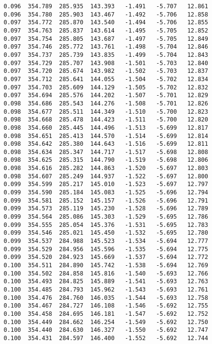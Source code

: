 \begin{verbatim}
   0.096  354.789  285.935  143.393   -1.491   -5.707   12.861
   0.096  354.780  285.903  143.467   -1.492   -5.706   12.858
   0.097  354.772  285.870  143.540   -1.494   -5.706   12.855
   0.097  354.763  285.837  143.614   -1.495   -5.705   12.852
   0.097  354.754  285.805  143.687   -1.497   -5.705   12.849
   0.097  354.746  285.772  143.761   -1.498   -5.704   12.846
   0.097  354.737  285.739  143.835   -1.499   -5.704   12.843
   0.097  354.729  285.707  143.908   -1.501   -5.703   12.840
   0.097  354.720  285.674  143.982   -1.502   -5.703   12.837
   0.097  354.712  285.641  144.055   -1.504   -5.702   12.834
   0.097  354.703  285.609  144.129   -1.505   -5.702   12.832
   0.097  354.694  285.576  144.202   -1.507   -5.701   12.829
   0.098  354.686  285.543  144.276   -1.508   -5.701   12.826
   0.098  354.677  285.511  144.349   -1.510   -5.700   12.823
   0.098  354.668  285.478  144.423   -1.511   -5.700   12.820
   0.098  354.660  285.445  144.496   -1.513   -5.699   12.817
   0.098  354.651  285.413  144.570   -1.514   -5.699   12.814
   0.098  354.642  285.380  144.643   -1.516   -5.699   12.811
   0.098  354.634  285.347  144.717   -1.517   -5.698   12.808
   0.098  354.625  285.315  144.790   -1.519   -5.698   12.806
   0.098  354.616  285.282  144.863   -1.520   -5.697   12.803
   0.098  354.607  285.249  144.937   -1.522   -5.697   12.800
   0.099  354.599  285.217  145.010   -1.523   -5.697   12.797
   0.099  354.590  285.184  145.083   -1.525   -5.696   12.794
   0.099  354.581  285.152  145.157   -1.526   -5.696   12.791
   0.099  354.573  285.119  145.230   -1.528   -5.696   12.789
   0.099  354.564  285.086  145.303   -1.529   -5.695   12.786
   0.099  354.555  285.054  145.376   -1.531   -5.695   12.783
   0.099  354.546  285.021  145.450   -1.532   -5.695   12.780
   0.099  354.537  284.988  145.523   -1.534   -5.694   12.777
   0.099  354.529  284.956  145.596   -1.535   -5.694   12.775
   0.099  354.520  284.923  145.669   -1.537   -5.694   12.772
   0.100  354.511  284.890  145.742   -1.538   -5.694   12.769
   0.100  354.502  284.858  145.816   -1.540   -5.693   12.766
   0.100  354.493  284.825  145.889   -1.541   -5.693   12.763
   0.100  354.485  284.793  145.962   -1.543   -5.693   12.761
   0.100  354.476  284.760  146.035   -1.544   -5.693   12.758
   0.100  354.467  284.727  146.108   -1.546   -5.692   12.755
   0.100  354.458  284.695  146.181   -1.547   -5.692   12.752
   0.100  354.449  284.662  146.254   -1.549   -5.692   12.750
   0.100  354.440  284.630  146.327   -1.550   -5.692   12.747
   0.100  354.431  284.597  146.400   -1.552   -5.692   12.744

\end{verbatim}
